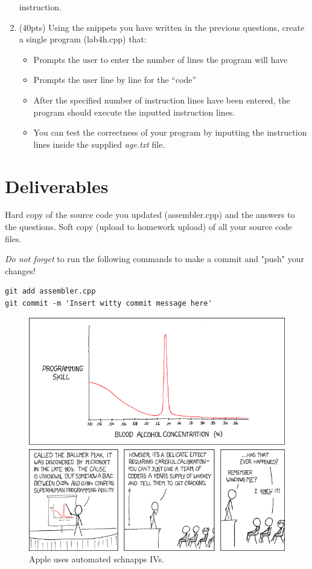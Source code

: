 \documentclass[letterpaper,12pt]{article}
\begin{document}
\begin{enumerate}
                   instruction.
    \item (40pts) Using the snippets you have written in the previous questions,
                  create a single program (lab4h.cpp) that:
                  \begin{itemize}
                      \item Prompts the user to enter the number of lines the program will have
                      \item Prompts the user line by line for the “code”
                      \item After the specified number of instruction lines have been entered,
                            the program should execute the inputted instruction lines.
                      \item You can test the correctness of your program by inputting the instruction
                          lines inside the supplied \emph{age.txt} file.
                  \end{itemize}

\end{enumerate}
\section*{Deliverables}
Hard copy of the source code you updated (assembler.cpp)
and the answers to the questions. Soft copy (upload to homework upload) of all your source code files.

\emph{Do not forget} to run the following commands to make a commit and "push" your changes!
\begin{lstlisting}
git add assembler.cpp
git commit -m 'Insert witty commit message here'
\end{lstlisting}

\begin{figure}[ht!]
	\centering
	\includegraphics[width=5in]{ballmer_peak.png}
    \caption*{Apple uses automated schnapps IVs.}
\end{figure}
\end{document}

